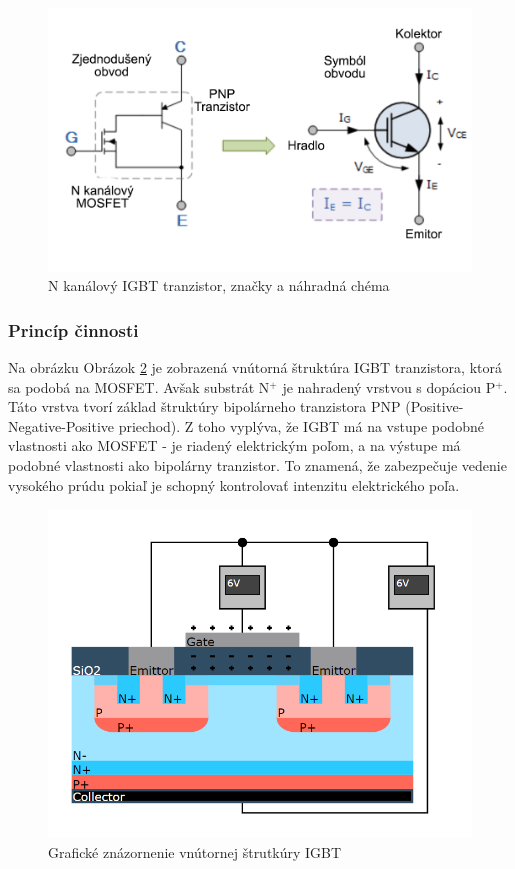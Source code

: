 \begin{figure}[!htbp]
    \centering
    \includegraphics[width=12cm]{img/igbtscheme.PNG}
    \caption{N kanálový IGBT tranzistor, značky a náhradná chéma \cite{c22}}
    \label{IGBTScheme}
\end{figure}

\subsubsection{Princíp činnosti}
\noindent Na obrázku Obrázok \ref{IGBT} je zobrazená vnútorná štruktúra \acrshort{IGBT} tranzistora, ktorá sa podobá na \acrshort{MOSFET}. Avšak substrát N$^+$ je nahradený vrstvou s dopáciou P$^+$. Táto vrstva tvorí základ štruktúry bipolárneho tranzistora \acrshort{PNP} (Positive-Negative-Positive priechod). Z toho vyplýva, že \acrshort{IGBT} má na vstupe podobné vlastnosti ako \acrshort{MOSFET} - je riadený elektrickým poľom, a na výstupe má podobné vlastnosti ako bipolárny tranzistor. To znamená, že zabezpečuje vedenie vysokého prúdu pokiaľ je schopný kontrolovať intenzitu elektrického poľa.

\begin{figure}[!htbp]
    \centering
    \includegraphics[width=12cm]{img/igbt.PNG}
    \caption{Grafické znázornenie vnútornej štrutkúry IGBT}
    \label{IGBT}
\end{figure}


